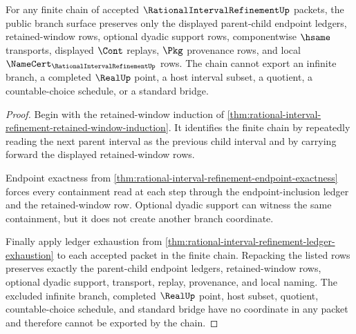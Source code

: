 \begin{theorem}
\label{thm:rational-interval-refinement-window-branch-exhaustion}
For any finite chain of accepted $\RationalIntervalRefinementUp$ packets, the public branch surface preserves only the displayed parent-child endpoint ledgers, retained-window rows, optional dyadic support rows, componentwise $\hsame$ transports, displayed $\Cont$ replays, $\Pkg$ provenance rows, and local $\NameCert_{\RationalIntervalRefinementUp}$ rows. The chain cannot export an infinite branch, a completed $\RealUp$ point, a host interval subset, a quotient, a countable-choice schedule, or a standard bridge.
\end{theorem}
\begin{proof}
Begin with the retained-window induction of \autoref{thm:rational-interval-refinement-retained-window-induction}. It identifies the finite chain by repeatedly reading the next parent interval as the previous child interval and by carrying forward the displayed retained-window rows.

Endpoint exactness from \autoref{thm:rational-interval-refinement-endpoint-exactness} forces every containment read at each step through the endpoint-inclusion ledger and the retained-window row. Optional dyadic support can witness the same containment, but it does not create another branch coordinate.

Finally apply ledger exhaustion from \autoref{thm:rational-interval-refinement-ledger-exhaustion} to each accepted packet in the finite chain. Repacking the listed rows preserves exactly the parent-child endpoint ledgers, retained-window rows, optional dyadic support, transport, replay, provenance, and local naming. The excluded infinite branch, completed $\RealUp$ point, host subset, quotient, countable-choice schedule, and standard bridge have no coordinate in any packet and therefore cannot be exported by the chain.
\end{proof}


